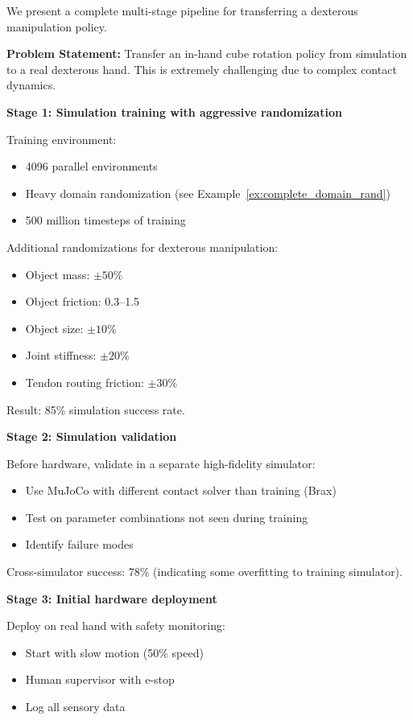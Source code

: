 \begin{example}
\label{ex:multistage_transfer}
We present a complete multi-stage pipeline for transferring a dexterous manipulation policy.

\textbf{Problem Statement:}
Transfer an in-hand cube rotation policy from simulation to a real dexterous hand. This is extremely challenging due to complex contact dynamics.

\textbf{Stage 1: Simulation training with aggressive randomization}

Training environment:
\begin{itemize}
    \item 4096 parallel environments
    \item Heavy domain randomization (see Example~\ref{ex:complete_domain_rand})
    \item 500 million timesteps of training
\end{itemize}

Additional randomizations for dexterous manipulation:
\begin{itemize}
    \item Object mass: $\pm 50\%$
    \item Object friction: 0.3--1.5
    \item Object size: $\pm 10\%$
    \item Joint stiffness: $\pm 20\%$
    \item Tendon routing friction: $\pm 30\%$
\end{itemize}

Result: 85\% simulation success rate.

\textbf{Stage 2: Simulation validation}

Before hardware, validate in a separate high-fidelity simulator:
\begin{itemize}
    \item Use MuJoCo with different contact solver than training (Brax)
    \item Test on parameter combinations not seen during training
    \item Identify failure modes
\end{itemize}

Cross-simulator success: 78\% (indicating some overfitting to training simulator).

\textbf{Stage 3: Initial hardware deployment}

Deploy on real hand with safety monitoring:
\begin{itemize}
    \item Start with slow motion (50\% speed)
    \item Human supervisor with e-stop
    \item Log all sensory data
\end{itemize}


\end{example}
